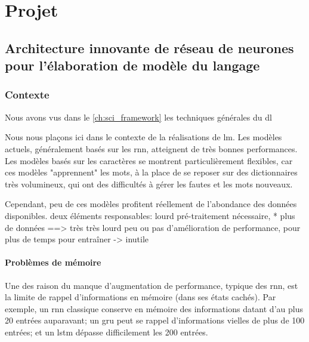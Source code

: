 \chapter{Projet\label{ch:projet}}

\section{Architecture innovante de réseau de neurones pour l'élaboration de modèle du langage}
\subsection{Contexte}
Nous avons vus dans le \autoref{ch:sci_framework} les techniques générales du \gls{dl} %

Nous nous plaçons ici dans le contexte de la réalisations de \gls{lm}.
Les modèles actuels, généralement basés sur les \gls{rnn}, atteignent de très bonnes performances. %
Les modèles basés sur les caractères se montrent particulièrement flexibles, car ces modèles "apprennent" les mots, à la place de se reposer sur des dictionnaires très volumineux, qui ont des difficultés à gérer les fautes et les mots nouveaux.

Cependant, peu de ces modèles profitent réellement de l'abondance des données disponibles.
deux éléments responsables:
 lourd pré-traitement nécessaire, * plus de données ==> très très lourd
 peu ou pas d'amélioration de performance, pour plus de temps pour entraîner -> inutile

\subsubsection*{Problèmes de mémoire}
Une des raison du manque d'augmentation de performance, typique des \gls{rnn}, est la limite de rappel d'informations en \og mémoire\fg{} (dans ses états cachés).
Par exemple, un \gls{rnn} classique conserve en mémoire des informations datant d'au plus 20 entrées auparavant; un \gls{gru} peut se rappel d'informations vielles de plus de 100 entrées; et un \gls{lstm} dépasse difficilement les 200 entrées.

